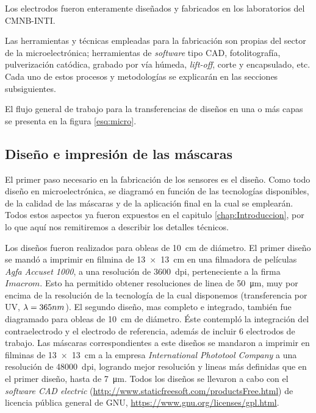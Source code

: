	 Los electrodos fueron enteramente diseñados y fabricados en los laboratorios del CMNB-INTI. 
		
	 Las herramientas y técnicas empleadas para la fabricación son propias del sector de la microelectrónica; herramientas de \textit{software} tipo CAD, fotolitografía, pulverización catódica, grabado por vía húmeda, \textit{lift-off}, corte y encapsulado, etc.\cite{Franssila2004,Jaeger2001} Cada uno de estos procesos y metodologías se explicarán en las secciones subsiguientes. 

	 El flujo general de trabajo para la transferencias de diseños en una o más capas se presenta en la figura \ref{esq:micro}.
			  
	\subsection{Diseño e impresión de las máscaras}\label{sec:impresion_mascaras}

		El primer paso necesario en la fabricación de los sensores es el diseño. Como todo diseño en microelectrónica, se diagramó en función de las tecnologías disponibles, de la calidad de las máscaras y de la aplicación final en la cual se emplearán. Todos estos aspectos ya fueron expuestos en el capitulo \ref{chap:Introduccion}, por lo que aquí nos remitiremos a describir los detalles técnicos.

		Los diseños fueron realizados para obleas de \SI{10}{\cm} de diámetro. El primer diseño se mandó a imprimir en filmina de \SI{13x13}{\cm} en una filmadora de películas \textit{Agfa Accuset 1000}, a una resolución de \SI{3600}{dpi}, perteneciente a la firma $Imacrom$. Esto ha permitido obtener resoluciones de linea de \SI{50}{\um}, muy por encima de la resolución de la tecnología de la cual disponemos (transferencia por UV, $\lambda\index{longitud de onda}=365nm$). El segundo diseño, mas completo e integrado, también fue diagramado para obleas de \SI{10}{\cm} de diámetro. Éste contempló la integración del contraelectrodo y el electrodo de referencia, además de incluir 6 electrodos de trabajo. Las máscaras correspondientes a este diseños se mandaron a imprimir en filminas de \SI{13x13}{\cm} a la empresa \textit{International Phototool Company} a una resolución de \SI{48000}{dpi}, logrando mejor resolución y lineas más definidas que en el primer diseño, hasta de \SI{7}{\um}. Todos los diseños se llevaron a cabo con el \textit{software CAD electric} (\url{http://www.staticfreesoft.com/productsFree.html}) de licencia pública general de GNU, \url{https://www.gnu.org/licenses/gpl.html}. 
				

